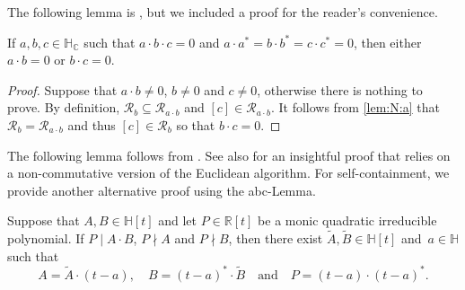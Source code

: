 \documentclass[11pt]{article}
\newcommand{\RL}[2]{\Cref{lem:#1}\ref{lem:#1:#2}}
\newcommand{\C}{\mathbb{C}}
\newcommand{\R}{\mathbb{R}}
\renewcommand{\H}{\mathbb{H}}
\newcommand{\cR}{\mathcal{R}}
\newcommand{\tA}{\tilde{A}}
\newcommand{\tB}{\tilde{B}}
\newcommand{\HC}{\mathbb{H}_{\C}}
\newcommand{\st}{such that }
\begin{document}
The following lemma is \citep[Lemma~2.2]{2022abc}, but we included a proof for
the reader's convenience.

\begin{lemma}
\label{lem:abc}
If $a,b,c\in\HC$ \st $a\cdot b\cdot c=0$ and $a\cdot a^*=b\cdot b^*=c\cdot c^*=0$,
then either $a\cdot b=0$ or $b\cdot c=0$.
\end{lemma}

\begin{proof}
Suppose that $a\cdot b\neq 0$, $b\neq 0$ and $c\neq0$, otherwise there is nothing to prove.
By definition, $\cR_b\subseteq \cR_{a\cdot b}$ and $[c]\in \cR_{a\cdot b}$.
It follows from \RL{N}{a} that $\cR_b=\cR_{a\cdot b}$ and thus $[c]\in\cR_b$
so that $b\cdot c=0$.
\end{proof}

The following lemma follows from \citep[Proposition~2.1]{2016new}.
See also \citep[Lemma~2]{2024} for an insightful proof that relies on
a non-commutative version of the Euclidean algorithm.
For self-containment, we provide another alternative proof using the abc-Lemma.

\begin{lemma}[AB-Lemma]
\label{lem:AB}
Suppose that $A,B\in\H[t]$ and let $P\in\R[t]$ be a monic quadratic irreducible polynomial.
If $P\mid A\cdot B$, $P\nmid A$ and $P\nmid B$,
then there exist $\tA,\tB\in\H[t]$ and~$a\in\H$ such that
\[
A=\tA\cdot (t-a),\quad
B=(t-a)^*\cdot\tB \quad\text{and}\quad
P=(t-a)\cdot (t-a)^*.
\]
\end{lemma}
\end{document}
